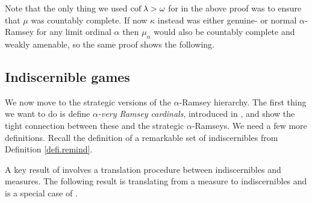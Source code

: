 \documentclass[../../main]{subfiles}
\begin{document}
Note that the only thing we used $\operatorname{cof}\lambda>\omega$ for in the above proof was to ensure that $\mu$ was countably complete. If now $\kappa$ instead was either genuine- or normal $\alpha$-Ramsey for any limit ordinal $\alpha$ then $\mu_\alpha$ would also be countably complete and weakly amenable, so the same proof shows the following.



\subsection{Indiscernible games}

We now move to the strategic versions of the $\alpha$-Ramsey hierarchy. The first thing we want to do is define \textit{$\alpha$-very Ramsey cardinals}, introduced in \cite{SharpeWelch}, and show the tight connection between these and the strategic $\alpha$-Ramseys. We need a few more definitions. Recall the definition of a remarkable set of indiscernibles from Definition \ref{defi.remind}.


A key result of \cite{SharpeWelch} involves a translation procedure between indiscernibles and measures. The following result is translating from a measure to indiscernibles and is a special case of \cite[Lemma 2.9]{SharpeWelch}.

\end{document}
